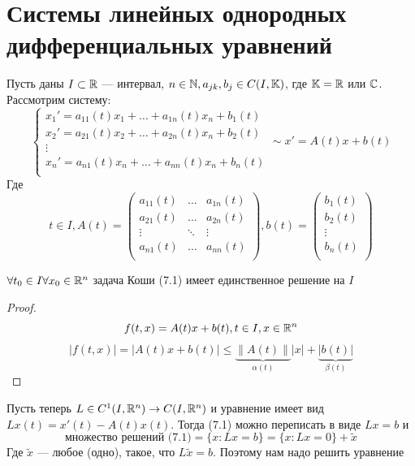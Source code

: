 

\section{Системы линейных однородных дифференциальных уравнений}
Пусть даны \(I \subset \mathbb{R}\) --- интервал, \(n \in \mathbb{N}, a_{jk}, b_j \in C(I, \mathbb{K})\), где \(\mathbb{K} = \mathbb{R}\) или \(\mathbb{C}\). Рассмотрим систему:
\begin{equation}
    \begin{cases}
        x_1' = a_{11}(t)x_1 + \dots + a_{1n}(t)x_n + b_1(t) \\
        x_2' = a_{21}(t)x_2 + \dots + a_{2n}(t)x_n + b_2(t) \\
        \vdots \\
        x_n' = a_{n1}(t)x_n + \dots + a_{nn}(t)x_n + b_n(t) \\
    \end{cases}
    \sim x' = A(t)x + b(t)
\end{equation}
Где
\[t \in I, A(t) = \left( \begin{array}{ccc}
    a_{11}(t) & \dots & a_{1n}(t) \\
    a_{21}(t) & \dots & a_{2n}(t) \\
    \vdots & \ddots & \vdots \\
    a_{n1}(t) & \dots & a_{nn}(t) \\
\end{array} \right), b(t) = \left( \begin{array}{c}
    b_1(t) \\
    b_2(t) \\
    \vdots \\
    b_n(t) \\
\end{array} \right)\]

\begin{corollary}
    \(\forall t_0 \in I \forall x_0 \in \mathbb{R}^n\) задача Коши (7.1) имеет единственное решение на \(I\)
\end{corollary}
\begin{proof}
    \[f(t, x) = A(t)x + b(t), t \in I, x \in \mathbb{R}^n\]
    \[|f(t, x)| = |A(t)x + b(t)| \le \underbrace{\|A(t)\|}_{\alpha(t)}|x| + \underbrace{|b(t)|}_{\beta(t)}\]
\end{proof}

Пусть теперь \(L \in C^1(I, \mathbb{R}^n) \rightarrow C(I, \mathbb{R}^n)\) и уравнение имеет вид \(Lx(t) = x'(t) - A(t)x(t)\). Тогда (7.1) можно переписать в виде \(Lx = b\) и 
\[\text{множество решений (7.1)} = \{x: Lx = b\} = \{x: Lx = 0\} + \tilde{x}\]
Где \(\tilde{x}\) --- любое (одно), такое, что \(L\tilde{x} = b\). Поэтому нам надо решить уравнение

